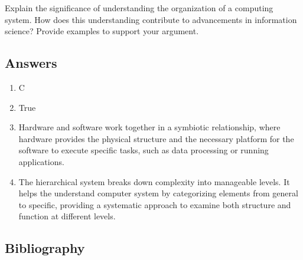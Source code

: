 \documentclass[
  letterpaper,
  DIV=11,
  numbers=noendperiod]{scrreprt}
\providecommand{\tightlist}{%
  \setlength{\itemsep}{0pt}\setlength{\parskip}{0pt}}\usepackage{longtable,booktabs,array}
\begin{document}
\begin{tcolorbox}[enhanced jigsaw, titlerule=0mm, rightrule=.15mm, bottomtitle=1mm, opacityback=0, bottomrule=.15mm, colbacktitle=quarto-callout-tip-color!10!white, opacitybacktitle=0.6, left=2mm, toprule=.15mm, colframe=quarto-callout-tip-color-frame, leftrule=.75mm, toptitle=1mm, colback=white, title=\textcolor{quarto-callout-tip-color}{\faLightbulb}\hspace{0.5em}{Critical Question}, breakable, coltitle=black, arc=.35mm]

Explain the significance of understanding the organization of a
computing system. How does this understanding contribute to advancements
in information science? Provide examples to support your argument.

\end{tcolorbox}

\subsection{Answers}\label{answers}

\begin{enumerate}
\def\labelenumi{\arabic{enumi}.}
\tightlist
\item
  C
\item
  True
\item
  Hardware and software work together in a symbiotic relationship, where
  hardware provides the physical structure and the necessary platform
  for the software to execute specific tasks, such as data processing or
  running applications.
\item
  The hierarchical system breaks down complexity into manageable levels.
  It helps the understand computer system by categorizing elements from
  general to specific, providing a systematic approach to examine both
  structure and function at different levels.
\end{enumerate}

\subsection{Bibliography}\label{bibliography}
\end{document}
